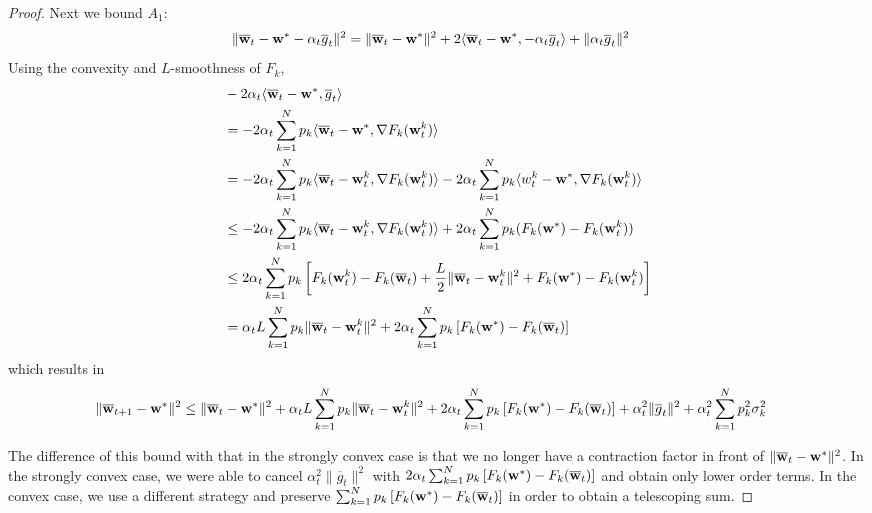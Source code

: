 \begin{proof}
	Next we bound $A_{1}$: 
	\begin{align*}
	\|{\overline{\mathbf{w}}}_{t}-{\mathbf{w}}^{\ast}-\alpha_{t}\overline{g}_{t}\|^{2} & =\|{\overline{\mathbf{w}}}_{t}-{\mathbf{w}}^{\ast}\|^{2}+2\langle{\overline{\mathbf{w}}}_{t}-{\mathbf{w}}^{\ast},-\alpha_{t}\overline{g}_{t}\rangle+\|\alpha_{t}\overline{g}_{t}\|^{2}
	\end{align*}
	Using the convexity and $L$-smoothness of $F_{k}$, 
	\begin{align*}
	& -2\alpha_{t}\langle{\overline{\mathbf{w}}}_{t}-{\mathbf{w}}^{\ast},\overline{g}_{t}\rangle\\
	& =-2\alpha_{t}\sum_{k=1}^{N}p_{k}\langle{\overline{\mathbf{w}}}_{t}-{\mathbf{w}}^{\ast},\nabla F_{k}({\mathbf{w}}_{t}^{k})\rangle\\
	& =-2\alpha_{t}\sum_{k=1}^{N}p_{k}\langle{\overline{\mathbf{w}}}_{t}-{\mathbf{w}}_{t}^{k},\nabla F_{k}({\mathbf{w}}_{t}^{k})\rangle-2\alpha_{t}\sum_{k=1}^{N}p_{k}\langle w_{t}^{k}-{\mathbf{w}}^{\ast},\nabla F_{k}({\mathbf{w}}_{t}^{k})\rangle\\
	& \leq-2\alpha_{t}\sum_{k=1}^{N}p_{k}\langle{\overline{\mathbf{w}}}_{t}-{\mathbf{w}}_{t}^{k},\nabla F_{k}({\mathbf{w}}_{t}^{k})\rangle+2\alpha_{t}\sum_{k=1}^{N}p_{k}(F_{k}({\mathbf{w}}^{\ast})-F_{k}({\mathbf{w}}_{t}^{k}))\\
	& \leq2\alpha_{t}\sum_{k=1}^{N}p_{k}\left[F_{k}({\mathbf{w}}_{t}^{k})-F_{k}({\overline{\mathbf{w}}}_{t})+\frac{L}{2}\|{\overline{\mathbf{w}}}_{t}-{\mathbf{w}}_{t}^{k}\|^{2}+F_{k}({\mathbf{w}}^{\ast})-F_{k}({\mathbf{w}}_{t}^{k})\right]\\
	& =\alpha_{t}L\sum_{k=1}^{N}p_{k}\|{\overline{\mathbf{w}}}_{t}-{\mathbf{w}}_{t}^{k}\|^{2}+2\alpha_{t}\sum_{k=1}^{N}p_{k}\left[F_{k}({\mathbf{w}}^{\ast})-F_{k}({\overline{\mathbf{w}}}_{t})\right]
	\end{align*}
	which results in 
	\begin{align*}
	\|{\overline{\mathbf{w}}}_{t+1}-{\mathbf{w}}^{\ast}\|^{2} & \leq\|{\overline{\mathbf{w}}}_{t}-{\mathbf{w}}^{\ast}\|^{2}+\alpha_{t}L\sum_{k=1}^{N}p_{k}\|{\overline{\mathbf{w}}}_{t}-{\mathbf{w}}_{t}^{k}\|^{2}+2\alpha_{t}\sum_{k=1}^{N}p_{k}\left[F_{k}({\mathbf{w}}^{\ast})-F_{k}({\overline{\mathbf{w}}}_{t})\right]+\alpha_{t}^{2}\|\overline{g}_{t}\|^{2}+\alpha_{t}^{2}\sum_{k=1}^{N}p_{k}^{2}\sigma_{k}^{2}
	\end{align*}
	
	The difference of this bound with that in the strongly convex case
	is that we no longer have a contraction factor in front of $\|{\overline{\mathbf{w}}}_{t}-{\mathbf{w}}^{\ast}\|^{2}$.
	In the strongly convex case, we were able to cancel $\alpha_{t}^{2}\|\overline{g}_{t}\|^{2}$
	with $2\alpha_{t}\sum_{k=1}^{N}p_{k}\left[F_{k}({\mathbf{w}}^{\ast})-F_{k}({\overline{\mathbf{w}}}_{t})\right]$
	and obtain only lower order terms. In the convex case, we use a different
	strategy and preserve $\sum_{k=1}^{N}p_{k}\left[F_{k}({\mathbf{w}}^{\ast})-F_{k}({\overline{\mathbf{w}}}_{t})\right]$
	in order to obtain a telescoping sum. 
	

\end{proof}
